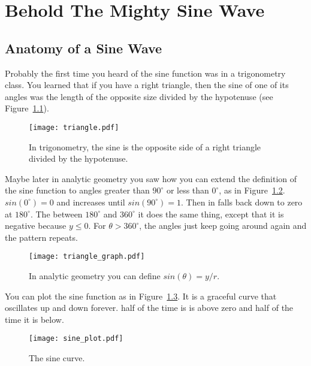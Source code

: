 \chapter{Behold The Mighty Sine Wave}

\section{Anatomy of a Sine Wave}

Probably the first time you heard of the sine function was in a 
trigonometry class. You learned that if you have a right triangle, then the
sine of one of its angles was the length of the opposite size divided by
the hypotenuse (see Figure~\ref{fig_triangle}).

\begin{figure}[htbp]
\centering
\texttt{[image: triangle.pdf]}
\caption{In trigonometry, the sine is the opposite side of a right 
triangle divided by the hypotenuse.}
\label{fig_triangle}
\end{figure}

Maybe later in analytic geometry you saw how you can extend the definition 
of the sine function
to angles greater than $90^\circ$ or less than $0^\circ$, as in 
Figure~\ref{fig_triangle_graph}. $sin(0^\circ) = 0$ and increases until
$sin(90^\circ) = 1$. Then in falls back down to zero at $180^\circ$.
The between $180^\circ$ and $360^\circ$ it does the same thing, except
that it is negative because $y \leq 0$. For $\theta > 360^\circ$, the
angles just keep going around again and the pattern repeats.

\begin{figure}[htbp]
\centering
\texttt{[image: triangle\_graph.pdf]}
\caption{In analytic geometry you can define $sin(\theta) = y/r$.}
\label{fig_triangle_graph}
\end{figure}

You can plot the sine function as in Figure~\ref{fig_sine_plot}. It is 
a graceful curve that oscillates up and down forever. half of the time
is is above zero and half of the time it is below.

\begin{figure}[htbp]
\centering
\texttt{[image: sine\_plot.pdf]}
\caption{The sine curve.}
\label{fig_sine_plot}
\end{figure}

